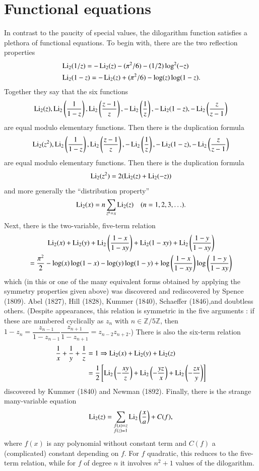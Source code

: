 \section{Functional equations}\label{art15-sec2}
In contrast to the paucity of special values, the dilogarithm function satisfies a plethora of functional equations. To begin with, there are the two reflection properties
\begin{align*}
& \operatorname{Li}_{2}(1/z)=-\operatorname{Li}_{2}(z)-(\pi^{2}/6)-(1/2)\log^{2}(-z)\\
& \operatorname{Li}_{2}(1-z)=-\operatorname{Li}_{2}(z)+(\pi^{2}/6)-\log(z)\log (1-z).
\end{align*}
Together they say that the six functions
$$
\operatorname{Li}_{2}(z), \operatorname{Li}_{2}\left(\dfrac{1}{1-z}\right), \operatorname{Li}_{2}\left(\dfrac{z-1}{z}\right), -\operatorname{Li}_{2}\left(\dfrac{1}{z}\right), -\operatorname{Li}_{2}(1-z), -\operatorname{Li}_{2}\left(\dfrac{z}{z-1}\right)
$$
are equal modulo elementary functions. Then there is the duplication formula
$$
\operatorname{Li}_{2}(z^{2}), \operatorname{Li}_{2}\left(\dfrac{1}{1-z}\right),\operatorname{Li}_{2}\left(\dfrac{z-1}{z}\right),-\operatorname{Li}_{2}\left(\dfrac{1}{z}\right),-\operatorname{Li}_{2}(1-z),-\operatorname{Li}_{2}\left(\dfrac{z}{z-1}\right)
$$
are equal modulo elementary functions. Then there is the duplication formula
$$
\operatorname{Li}_{2}(z^{2})=2(\operatorname{Li}_{2}(z)+\operatorname{Li}_{2}(-z))
$$
and more generally the ``distribution property''
$$
\operatorname{Li}_{2}(x)=n\sum\limits_{z^{n}=x}\operatorname{Li}_{2}(z)\quad (n=1,2,3,\ldots).
$$
Next, there is the two-variable, five-term relation
\begin{gather*}
\operatorname{Li}_{2}(x)+\operatorname{Li}_{2}(y)+\operatorname{Li}_{2}\left(\dfrac{1-x}{1-xy}\right)+\operatorname{Li}_{2}(1-xy)+\operatorname{Li}_{2}\left(\dfrac{1-y}{1-xy}\right)\\
=\frac{\pi^{2}}{2}-\log(x)\log(1-x)-\log(y)\log(1-y)+\log\left(\dfrac{1-x}{1-xy}\right)\log\left(\dfrac{1-y}{1-xy}\right)
\end{gather*}
which (in this or one of the many equivalent forms obtained by applying the symmetry properties given above) was discovered and rediscovered by Spence (1809). Abel (1827), Hill (1828), Kummer (1840), Schaeffer (1846),\pageoriginale and doubtless others. (Despite appearances, this relation is symmetric in the five arguments : if these are numbered cyclically as $z_{n}$ with $n\in \mathbb{Z}/5\mathbb{Z}$, then $1-z_{n}=\dfrac{z_{n-1}}{1-z_{n-1}}\dfrac{z_{n+1}}{1-z_{n+1}}=z_{n-2}z_{n+2}.$) There is also the six-term relation
\begin{align*}
\frac{1}{x}+\frac{1}{y}+\frac{1}{z} &= 1\Rightarrow \operatorname{Li}_{2}(x)+\operatorname{Li}_{2}(y)+\operatorname{Li}_{2}(z)\\
&= \frac{1}{2}\left[\operatorname{Li}_{2}\left(-\dfrac{xy}{z}\right)+\operatorname{Li}_{2}\left(-\dfrac{yz}{x}\right)+\operatorname{Li}_{2}\left(-\dfrac{zx}{y}\right)\right]
\end{align*}
discovered by Kummer (1840) and Newman (1892). Finally, there is the strange many-variable equation
\begin{equation}
\operatorname{Li}_{2}(z)=\sum\limits_{\substack{f(x)=z\\ f(z)=1}}\operatorname{Li}_{2}\left(\dfrac{x}{a}\right)+C(f),\label{art15-eq1}
\end{equation}
where $f(x)$ is any polynomial without constant term and $C(f)$ a (complicated) constant depending on $f$. For $f$ quadratic, this reduces to the five-term relation, while for $f$ of degree $n$ it involves $n^{2}+1$ values of the dilogarithm.


